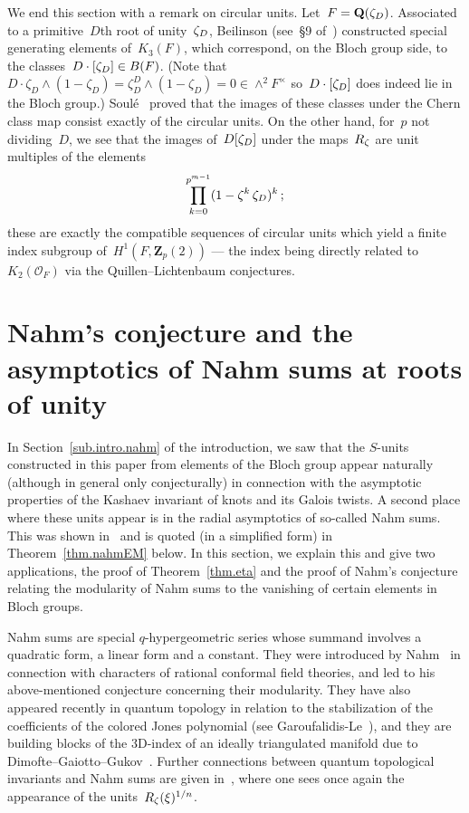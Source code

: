 \documentclass[12pt,reqno]{amsart}
\theoremstyle{definition}
\newcommand{\changed}[1]{{#1}}
\def\Q{\mathbf Q}   %
\def\Z{\mathbf Z}   %
\def\ll{m}
\def\OL{\mathcal{O}}
\begin{document}
We end this section with a remark on circular units.
Let~$F = \Q(\z_D)$. Associated to a primitive~$D$th root of 
unity~$\zeta_D$, Beilinson (see~\S9 of~\cite{Huber}) constructed special 
generating elements of~$K_3(F)$, which correspond, on the Bloch group side, 
to the classes~$D \cdot [\zeta_D] \in B(F)$.
\changed{(Note that~$D \cdot \zeta_D \wedge (1-\zeta_D)
= \zeta^D_D \wedge (1 - \zeta_D) = 0 \in \wedge^2 F^{\times}$ so~$D \cdot [\zeta_D]$
does indeed lie in the Bloch group.)}
Soul\'{e}~\cite{Soule3} proved that the images of these classes under the 
Chern class map consist exactly of the circular units.
On the other hand, for~$p$ not dividing~$D$, we see that the images 
of~$D [\zeta_D]$ under the maps~$R_\zeta$ are unit multiples of the elements
$$
\prod_{k=0}^{p^{\ll-1}} (1 - \z^k\,\z_D)^k\,;
$$
these are exactly the compatible sequences of circular units
which yield a finite index subgroup of~$H^1(F,\Z_p(2))$ --- the index being 
directly related to~$K_2(\OL_F)$ via the Quillen--Lichtenbaum conjectures. 


\section{Nahm's conjecture and the asymptotics of Nahm sums 
at roots of unity}
\label{sec.nahm}

\changed{In Section~\ref{sub.intro.nahm} of the introduction}, we saw that the
\changed{$S$-units} constructed in 
this paper from elements of the Bloch group appear naturally (although in 
general only conjecturally) in connection with the asymptotic properties of 
the Kashaev invariant of knots and its Galois twists. A second place where 
these units appear is in the radial asymptotics of so-called Nahm
sums\changed{. This}
was shown in~\cite{GZ:asymptotics} and is quoted (in a simplified form) in 
Theorem~\ref{thm.nahmEM} below. In this section,  we explain this and give 
two applications, the proof of Theorem~\ref{thm.eta} 
and the proof of Nahm's conjecture relating the modularity 
of Nahm sums to the vanishing of certain elements in Bloch groups.

Nahm sums are special $q$-hypergeometric series whose summand involves
a quadratic form, a linear form and a constant.  They were introduced
by Nahm~\cite{Nahm} in connection with characters of rational conformal 
field theories, and led to his above-mentioned conjecture concerning their 
modularity. They have also appeared recently in quantum topology in relation 
to the stabilization of the coefficients of the colored Jones 
polynomial (see Garoufalidis-Le~\cite{GL:Nahm}), and they are building blocks 
of the 3D-index of an ideally triangulated manifold due to 
Dimofte--Gaiotto--Gukov~\cite{DGG1,DGG2}. Further connections between 
quantum topological invariants and Nahm sums are given in~\cite{GZ:qseries}, 
where one sees once again the appearance of the units~$R_\zeta(\xi)^{1/n}$.
\end{document}
